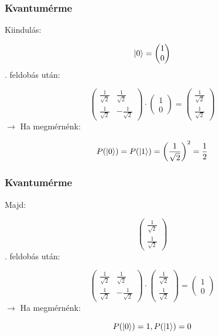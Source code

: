 \documentclass[aspectratio=169]{beamer}
\begin{document}
\begin{frame}
  \frametitle{Kvantumérme}

  Kiindulás:

  \[\ket{0} = \begin{pmatrix} 1 \\ 0 \end{pmatrix}\]
  . feldobás után:

  \[\begin{pmatrix} \frac{1}{\sqrt{2}} & \frac{1}{\sqrt{2}}
      \\ \frac{1}{\sqrt{2}} & -\frac{1}{\sqrt{2}}\end{pmatrix} \cdot
    \begin{pmatrix} 1 \\ 0 \end{pmatrix} = \begin{pmatrix}
      \frac{1}{\sqrt{2}} \\ \frac{1}{\sqrt{2}}
    \end{pmatrix} \]
  \pause
  $\rightarrow$ Ha megmérnénk:

  \[P(\ket{0}) = P(\ket{1}) = \left(\frac{1}{\sqrt{2}} \right)^2 = \frac{1}{2}\]


\end{frame}

\begin{frame}
  \frametitle{Kvantumérme}

  Majd:

  \[\begin{pmatrix}
      \frac{1}{\sqrt{2}} \\ \frac{1}{\sqrt{2}}
    \end{pmatrix}\]
  . feldobás után:

  \[\begin{pmatrix} \frac{1}{\sqrt{2}} & \frac{1}{\sqrt{2}}
      \\ \frac{1}{\sqrt{2}} & -\frac{1}{\sqrt{2}}\end{pmatrix} \cdot
    \begin{pmatrix} \frac{1}{\sqrt{2}} \\ \frac{1}{\sqrt{2}} \end{pmatrix} = \begin{pmatrix}
      1 \\ 0
    \end{pmatrix} \]
  \pause
  $\rightarrow$ Ha megmérnénk:

  \[P(\ket{0}) = 1, P(\ket{1}) = 0\]


\end{frame}
\end{document}
